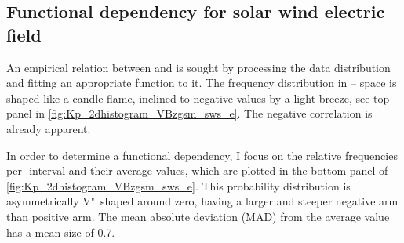 \subsection{Functional dependency for solar wind electric field}
An empirical relation between \vBz{} and \Kp{} is sought by processing the data distribution and fitting an appropriate function to it.
The frequency distribution in \Kp--\vBz{} space is shaped like a candle flame, inclined to negative values by a light breeze, see top panel in \autoref{fig:Kp_2dhistogram_VBzgsm_sws_e}. The negative correlation is already apparent.
\begin{figure}
\end{figure}
In order to determine a functional dependency, I focus on the relative frequencies per \vBz-interval and their average \Kp{} values, which are plotted in the bottom panel of \autoref{fig:Kp_2dhistogram_VBzgsm_sws_e}. This probability distribution is asymmetrically V"~shaped around zero, having a larger and steeper negative arm than positive arm. The mean absolute deviation (MAD) from the average \Kp{} value has a mean size of \num{0.7}.

